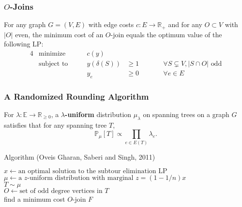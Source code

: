 \documentclass{beamer}
\newcommand{\RR}{\mathbb{R}}
\newcommand{\EE}{\mathbb{E}}
\newcommand{\PP}{\mathbb{P}}
\begin{document}
  \begin{frame}
    \frametitle{$O$-Joins}
  
    \begin{theorem}
      For any graph $G = (V, E)$ with edge costs $c : E \to \RR_+$ and for any $O \subset V$ with $|O|$ even, the minimum cost of an $O$-join equals the optimum value of the following LP:
      \begin{alignat*}{4}
        & \text{minimize} \qquad & c(y) \\
        & \text{subject to} \qquad & y(\delta(S)) &\geq 1 && \qquad \forall S \subsetneq V, |S \cap O| \text{ odd} \\
        & & y_e &\geq 0 && \qquad \forall e \in E
      \end{alignat*}
    \end{theorem}
  
  \end{frame}

  \begin{frame}
    \frametitle{A Randomized Rounding Algorithm}

    \begin{definition}
      For $\lambda: \EE \to \RR_{\geq 0}$, a {\bf $\lambda$-uniform} distribution $\mu_\lambda$ on spanning trees on a graph $G$ satisfies that for any spanning tree $T$,
      $$ \PP_\mu[T] \propto \prod_{e \in E(T)} \lambda_e. $$
    \end{definition}

    \pause
  
    \begin{block}{Algorithm (Oveis Gharan, Saberi and Singh, 2011)}
      \begin{algorithm}[H]
        $x \leftarrow \text{an optimal solution to the subtour elimination LP}$ \\
        $\mu \leftarrow \text{a $z$-uniform distribution with marginal $z = (1 - 1/n) x$}$ \\
        $T \sim \mu$ \\
        $O \leftarrow \text{set of odd degree vertices in $T$}$ \\
        find a minimum cost $O$-join $F$ \\
      \end{algorithm}
    \end{block}
  
  \end{frame}
\end{document}
